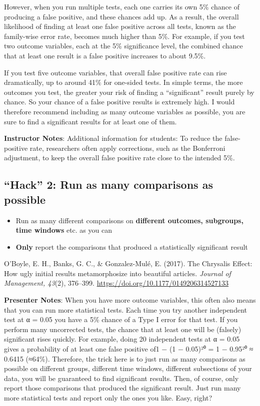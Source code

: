 \documentclass[
  letterpaper,
  DIV=11,
  numbers=noendperiod]{scrartcl}
\providecommand{\tightlist}{%
  \setlength{\itemsep}{0pt}\setlength{\parskip}{0pt}}
\begin{document}
However, when you run multiple tests, each one carries its own 5\%
chance of producing a false positive, and these chances add up. As a
result, the overall likelihood of finding at least one false positive
across all tests, known as the family-wise error rate, becomes much
higher than 5\%. For example, if you test two outcome variables, each at
the 5\% significance level, the combined chance that at least one result
is a false positive increases to about 9.5\%.

If you test five outcome variables, that overall false positive rate can
rise dramatically, up to around 41\% for one-sided tests. In simple
terms, the more outcomes you test, the greater your risk of finding a
``significant'' result purely by chance. So your chance of a false
positive results is extremely high. I would therefore recommend
including as many outcome variables as possible, you are sure to find a
significant results for at least one of them.

\textbf{Instructor Notes}: Additional information for students: To
reduce the false-positive rate, researchers often apply corrections,
such as the Bonferroni adjustment, to keep the overall false positive
rate close to the intended 5\%.

\subsection{``Hack'' 2: Run as many comparisons as
possible}\label{hack-2-run-as-many-comparisons-as-possible}

\begin{itemize}
\tightlist
\item
  Run as many different comparisons on \textbf{different outcomes,
  subgroups, time windows} etc. as you can
\item
  \textbf{Only} report the comparisons that produced a statistically
  significant result
\end{itemize}

O'Boyle, E. H., Banks, G. C., \& Gonzalez-Mulé, E. (2017). The Chrysalis
Effect: How ugly initial results metamorphosize into beautiful articles.
\emph{Journal of Management, 43}(2), 376--399.
\url{https://doi.org/10.1177/0149206314527133}

\textbf{Presenter Notes}: When you have more outcome variables, this
often also means that you can run more statistical tests. Each time you
try another independent test at α = 0.05 you have a 5\% chance of a Type
I error for that test. If you perform many uncorrected tests, the chance
that at least one will be (falsely) significant rises quickly. For
example, doing 20 independent tests at α = 0.05 gives a probability of
at least one false positive of1 − (1 − 0.05)²⁰ = 1 − 0.95²⁰ ≈ 0.6415
(≈64\%). Therefore, the trick here is to just run as many comparisons as
possible on different groups, different time windows, different
subsections of your data, you will be guaranteed to find significant
results. Then, of course, only report those comparisons that produced
the significant result. Just run many more statistical tests and report
only the ones you like. Easy, right?
\end{document}
